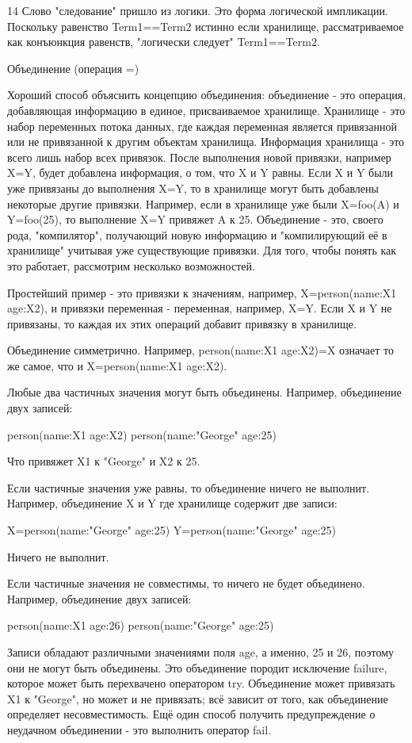14 Слово "следование" пришло из логики. Это форма логической импликации. Поскольку равенство Term1==Term2 истинно если хранилище, рассматриваемое как конъюнкция равенств, "логически следует" Term1==Term2.

Объединение (операция =)

Хороший способ объяснить концепцию объединения: объединение - это операция, добавляющая информацию в единое, присваиваемое хранилище. Хранилище - это набор переменных потока данных, где каждая переменная является привязанной или не привязанной к другим объектам хранилища. Информация хранилища - это всего лишь набор всех привязок. После выполнения новой привязки, например X=Y, будет добавлена информация, о том, что X и Y равны. Если X и Y были уже привязаны до выполнения X=Y, то в хранилище могут быть добавлены некоторые другие привязки. Например, если в хранилище уже были X=foo(A) и Y=foo(25), то выполнение X=Y привяжет A к 25. Объединение - это, своего рода, "компилятор", получающий новую информацию и "компилирующий её в хранилище" учитывая уже существующие привязки. Для того, чтобы понять как это работает, рассмотрим несколько возможностей.

Простейший пример - это привязки к значениям, например, X=person(name:X1 age:X2), и привязки переменная - переменная, например, X=Y. Если X и Y не привязаны, то каждая их этих операций добавит привязку в хранилище.

Объединение симметрично. Например, person(name:X1 age:X2)=X означает то же самое, что и X=person(name:X1 age:X2).

Любые два частичных значения могут быть объединены. Например, объединение двух записей:

person(name:X1 age:X2)
person(name:"George" age:25)

Что привяжет X1 к "George" и X2 к 25.

Если частичные значения уже равны, то объединение ничего не выполнит. Например, объединение X и Y где хранилище содержит две записи:

X=person(name:"George" age:25)
Y=person(name:"George" age:25)

Ничего не выполнит.

Если частичные значения не совместимы, то ничего не будет объединено. Например, объединение двух записей:

person(name:X1 age:26)
person(name:"George" age:25)

Записи обладают различными значениями поля age, а именно, 25 и 26, поэтому они не могут быть объединены. Это объединение породит исключение failure, которое может быть перехвачено оператором try. Объединение может привязать X1 к "George", но может и не привязать; всё зависит от того, как объединение определяет несовместимость. Ещё один способ получить предупреждение о неудачном объединении - это выполнить оператор fail.

